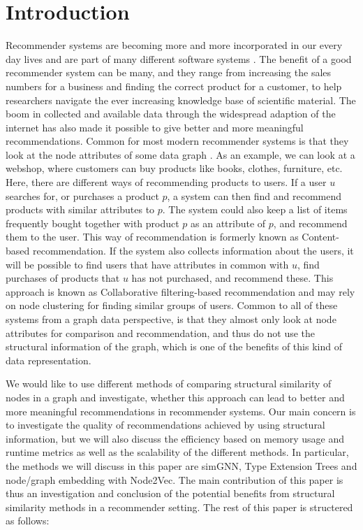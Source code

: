 \section{Introduction}
  Recommender systems are becoming more and more incorporated in our every day lives and are part of many different software systems \cite{recommender_e-comerce}. The benefit of a good recommender system can be many, and they range from increasing the sales numbers for a business and finding the correct product for a customer, to help researchers navigate the ever increasing knowledge base of scientific material. The boom in collected and available data through the widespread adaption of the internet has also made it possible to give better and more meaningful recommendations.
  Common for most modern recommender systems is that they look at the node attributes of some data graph \cite{Ricci2015}. As an example, we can look at a webshop, where customers can buy products like books, clothes, furniture, etc. Here, there are different ways of recommending products to users. If a user $u$ searches for, or purchases a product $p$, a system can then find and recommend products with similar attributes to $p$. The system could also keep a list of items frequently bought together with product $p$ as an attribute of $p$, and recommend them to the user. This way of recommendation is formerly known as Content-based recommendation. If the system also collects information about the users, it will be possible to find users that have attributes in common with $u$, find purchases of products that $u$ has not purchased, and recommend these. This approach is known as Collaborative filtering-based recommendation and may rely on node clustering for finding similar groups of users. Common to all of these systems from a graph data perspective, is that they almost only look at node attributes for comparison and recommendation, and thus do not use the structural information of the graph, which is one of the benefits of this kind of data representation.

  We would like to use different methods of comparing structural similarity of nodes in a graph and investigate, whether this approach can lead to better and more meaningful recommendations in recommender systems. Our main concern is to investigate the quality of recommendations achieved by using structural information, but we will also discuss the efficiency based on memory usage and runtime metrics as well as the scalability of the different methods. In particular, the methods we will discuss in this paper are simGNN, Type Extension Trees and node/graph embedding with Node2Vec.
  The main contribution of this paper is thus an investigation and conclusion of the potential benefits from structural similarity methods in a recommender setting. The rest of this paper is structered as follows:
